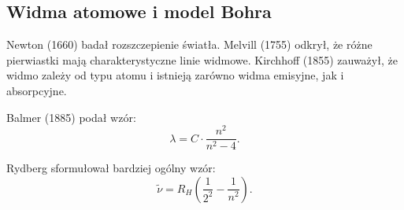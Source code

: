 \subsection{Widma atomowe i model Bohra}
Newton (1660) badał rozszczepienie światła. Melvill (1755) odkrył, że różne pierwiastki mają charakterystyczne linie widmowe. Kirchhoff (1855) zauważył, że widmo zależy od typu atomu i istnieją zarówno widma emisyjne, jak i absorpcyjne.

Balmer (1885) podał wzór:
\begin{equation*}
    \lambda = C \cdot \frac{n^2}{n^2 - 4}.
\end{equation*}

Rydberg sformułował bardziej ogólny wzór:
\begin{equation*}
    \tilde{\nu} = R_H \left( \frac{1}{2^2} - \frac{1}{n^2} \right).
\end{equation*}
